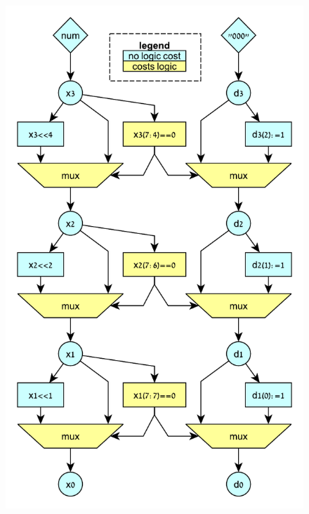 \begin{figure}[h]
  \centering
  \includegraphics[width=0.8\linewidth]{graphics/lzc_dataflow.pdf}
  \label{fig:LZC_Dataflow}
\end{figure}
